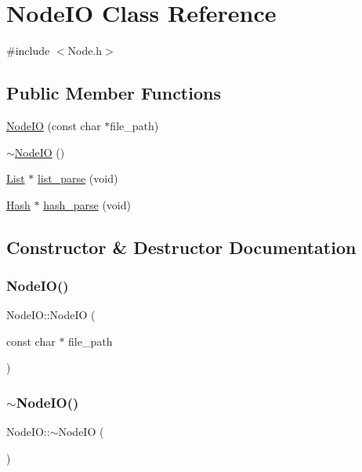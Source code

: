 \hypertarget{classNodeIO}{}\section{Node\+IO Class Reference}
\label{classNodeIO}


{\ttfamily \#include $<$Node.\+h$>$}

\subsection*{Public Member Functions}
\begin{DoxyCompactItemize}
\item 
\mbox{\hyperlink{classNodeIO_a5d2f341752d5783443532c7471665390}{Node\+IO}} (const char $\ast$file\+\_\+path)
\item 
\mbox{\hyperlink{classNodeIO_a1a6f33318c71785e3295874f48f881fc}{$\sim$\+Node\+IO}} ()
\item 
\mbox{\hyperlink{classList}{List}} $\ast$ \mbox{\hyperlink{classNodeIO_a03d8bdbc6fcb5a11538fdda2a6ae751d}{list\+\_\+parse}} (void)
\item 
\mbox{\hyperlink{classHash}{Hash}} $\ast$ \mbox{\hyperlink{classNodeIO_a98fbf4c66109a6ec3e89f98855fa8c5b}{hash\+\_\+parse}} (void)
\end{DoxyCompactItemize}


\subsection{Constructor \& Destructor Documentation}
\mbox{\label{classNodeIO_a5d2f341752d5783443532c7471665390}} 
\subsubsection{\texorpdfstring{Node\+I\+O()}{NodeIO()}}
{\footnotesize\ttfamily Node\+I\+O\+::\+Node\+IO (\begin{DoxyParamCaption}\item[{const char $\ast$}]{file\+\_\+path }\end{DoxyParamCaption})}

\mbox{\label{classNodeIO_a1a6f33318c71785e3295874f48f881fc}} 
\subsubsection{\texorpdfstring{$\sim$\+Node\+I\+O()}{~NodeIO()}}
{\footnotesize\ttfamily Node\+I\+O\+::$\sim$\+Node\+IO (\begin{DoxyParamCaption}{ }\end{DoxyParamCaption})}



